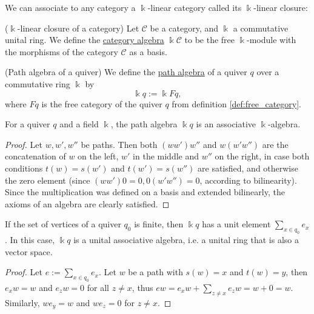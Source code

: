\noindent We can associate to any category a $\Bbbk$-linear category called its $\Bbbk$-linear closure:

\begin{definition}{($\Bbbk$-linear closure of a category)}
Let $\mathcal{C}$ be a category, and $\Bbbk$ a commutative unital ring. We define the \ul{category algebra} $\Bbbk \mathcal{C}$ to be
the free $\Bbbk$-module with the morphisms of the category $\mathcal{C}$ as a basis.
\end{definition}

\begin{definition}{(Path algebra of a quiver)}\label{def:path_algebra}
We define the \ul{path algebra} of a quiver $q$ over a commutative ring $\Bbbk$ by
\[
\Bbbk q := \Bbbk Fq,
\]
where $Fq$ is the free category of the quiver $q$ from definition \ref{def:free_category}.
\end{definition}

\begin{lemma}\label{la:path_algebra_is_ass_algebra}
For a quiver $q$ and a field $\Bbbk$, the path algebra $\Bbbk q$ is an associative $\Bbbk$-algebra.
\end{lemma}
\begin{proof}
Let $w, w', w''$ be paths. Then both $(ww')w''$ and $w(w'w'')$ are the concatenation of $w$ on the left,
$w'$ in the middle and $w''$ on the right, in case both conditions $t(w) = s(w')$ and $t(w') = s(w'')$ are satisfied, and
otherwise the zero element (since $(ww')0 = 0, 0(w'w'') = 0$, according to bilinearity).\\
Since the multiplication was defined on a basis and extended bilinearly, the axioms of an algebra are clearly satisfied.
\end{proof}

\begin{lemma}\label{la:unit_in_path_algebra}
If the set of vertices of a quiver $q_{0}$ is finite, then $\Bbbk q$ has a unit element $\sum_{x\in q_{0}} e_{x}$. In this case, $\Bbbk q$ is a unital
associative algebra, i.e. a unital ring that is also a vector space.
\end{lemma}
\begin{proof}
Let $e := \sum_{x\in q_{0}} e_{x}$. Let $w$ be a path with $s(w) = x$ and $t(w) = y$, then $e_{x}w = w$ and $e_{z}w = 0$ for all $z \neq x$,
thus $ew = e_{x}w + \sum_{z\neq x} e_{z}w = w + 0 = w$. Similarly, $we_{y} = w$ and $we_{z} = 0$ for $z \neq x$.

\end{proof}

